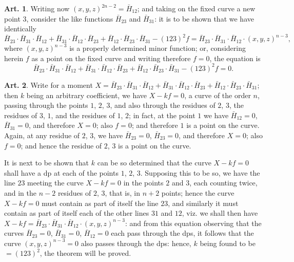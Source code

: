 \documentclass[12pt,a4paper]{article}
\theoremstyle{definition}
\newtheorem{art}{Art.}[section]
\begin{document}
\begin{art}\label{art:55}
Writing now $(x, y, z)^{2n-2} = \bar{H}_{12}$; and taking on the fixed curve a new point $3$, consider the like functions $\bar{H}_{23}$ and $\bar{H}_{31}$: it is to be shown that we have identically
\[
\bar{H}_{23} \cdot \bar{H}_{31} \cdot \bar{H}_{12} + \bar{H}_{31} \cdot \bar{H}_{12} \cdot \bar{H}_{23} + \bar{H}_{12} \cdot \bar{H}_{23} \cdot \bar{H}_{31} - (123)^2 f = \bar{H}_{23} \cdot \bar{H}_{31} \cdot \bar{H}_{12} \cdot (x, y, z)^{n-3},
\]
where $(x, y, z)^{n-3}$ is a properly determined minor function; or, considering herein $f$ as a point on the fixed curve and writing therefore $f = 0$, the equation is
\[
\bar{H}_{23} \cdot \bar{H}_{31} \cdot \bar{H}_{12} + \bar{H}_{31} \cdot \bar{H}_{12} \cdot \bar{H}_{23} + \bar{H}_{12} \cdot \bar{H}_{23} \cdot \bar{H}_{31} - (123)^2 f = 0.
\]
\end{art}

\begin{art}\label{art:56}
Write for a moment $X = \bar{H}_{23} \cdot \bar{H}_{31} \cdot \bar{H}_{12} + \bar{H}_{31} \cdot \bar{H}_{12} \cdot \bar{H}_{23} + \bar{H}_{12} \cdot \bar{H}_{23} \cdot \bar{H}_{31}$; then $k$ being an arbitrary coefficient, we have $X - kf = 0$, a curve of the order $n$, passing through the points $1$, $2$, $3$, and also through the residues of $2$, $3$, the residues of $3$, $1$, and the residues of $1$, $2$; in fact, at the point $1$ we have $\bar{H}_{12} = 0$, $\bar{H}_{31} = 0$, and therefore $X = 0$; also $f = 0$; and therefore $1$ is a point on the curve. Again, at any residue of $2$, $3$, we have $\bar{H}_{23} = 0$, $\bar{H}_{23} = 0$, and therefore $X = 0$; also $f = 0$; and hence the residue of $2$, $3$ is a point on the curve.

It is next to be shown that $k$ can be so determined that the curve $X - kf = 0$ shall have a dp at each of the points $1$, $2$, $3$. Supposing this to be so, we have the line $23$ meeting the curve $X - kf = 0$ in the points $2$ and $3$, each counting twice, and in the $n-2$ residues of $2$, $3$, that is, in $n + 2$ points; hence the curve $X - kf = 0$ must contain as part of itself the line $23$, and similarly it must contain as part of itself each of the other lines $31$ and $12$, viz. we shall then have $X - kf = \bar{H}_{23} \cdot \bar{H}_{31} \cdot \bar{H}_{12} \cdot (x, y, z)^{n-3}$: and from this equation observing that the curves $\bar{H}_{23} = 0$, $\bar{H}_{31} = 0$, $\bar{H}_{12} = 0$ each pass through the dps, it follows that the curve $(x, y, z)^{n-3} = 0$ also passes through the dps: hence, $k$ being found to be $= (123)^2$, the theorem will be proved.
\end{art}
\end{document}
